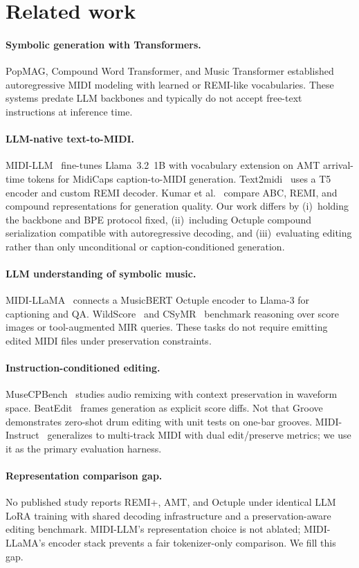\section{Related work}

\paragraph{Symbolic generation with Transformers.}
PopMAG, Compound Word Transformer, and Music Transformer established autoregressive MIDI modeling with learned or REMI-like vocabularies. These systems predate LLM backbones and typically do not accept free-text instructions at inference time.

\paragraph{LLM-native text-to-MIDI.}
MIDI-LLM~\cite{wu2026midillm} fine-tunes Llama~3.2~1B with vocabulary extension on AMT arrival-time tokens for MidiCaps caption-to-MIDI generation. Text2midi~\cite{text2midi2025} uses a T5 encoder and custom REMI decoder. Kumar et al.~\cite{kumar2026abc} compare ABC, REMI, and compound representations for generation quality. Our work differs by (i)~holding the backbone and BPE protocol fixed, (ii)~including Octuple compound serialization compatible with autoregressive decoding, and (iii)~evaluating editing rather than only unconditional or caption-conditioned generation.

\paragraph{LLM understanding of symbolic music.}
MIDI-LLaMA~\cite{midillama2026} connects a MusicBERT Octuple encoder to Llama-3 for captioning and QA. WildScore~\cite{mundada2025wildscore} and CSyMR~\cite{wang2026csymr} benchmark reasoning over score images or tool-augmented MIR queries. These tasks do not require emitting edited MIDI files under preservation constraints.

\paragraph{Instruction-conditioned editing.}
MuseCPBench~\cite{vishe2025musecpbench} studies audio remixing with context preservation in waveform space. BeatEdit~\cite{gu2026beatedit} frames generation as explicit score diffs. Not that Groove~\cite{groove2025} demonstrates zero-shot drum editing with unit tests on one-bar grooves. MIDI-Instruct~\cite{goh2026midiinstruct} generalizes to multi-track MIDI with dual edit/preserve metrics; we use it as the primary evaluation harness.

\paragraph{Representation comparison gap.}
No published study reports REMI+, AMT, and Octuple under identical LLM LoRA training with shared decoding infrastructure and a preservation-aware editing benchmark. MIDI-LLM's representation choice is not ablated; MIDI-LLaMA's encoder stack prevents a fair tokenizer-only comparison. We fill this gap.
